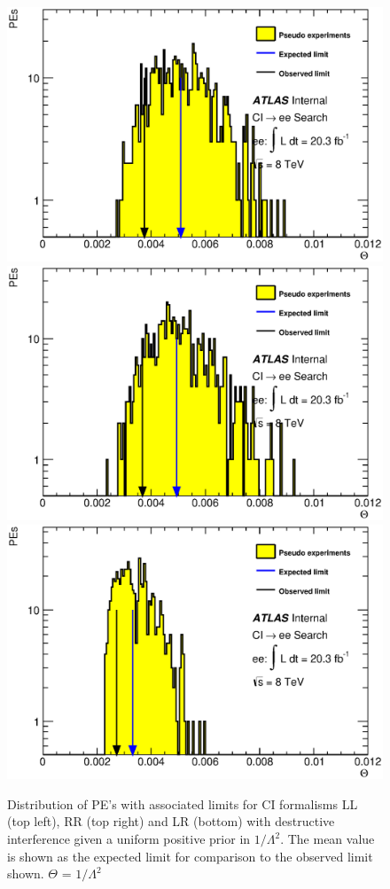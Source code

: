     \begin{figure}[h]
        \begin{center}
            \includegraphics[width=0.7\linewidth]{images/ee__LL_plus_L2/Theta.eps}
            \includegraphics[width=0.7\linewidth]{images/ee__RR_plus_L2/Theta.eps}
            \includegraphics[width=0.7\linewidth]{images/ee__LR_plus_L2/Theta.eps}
        \end{center}
       \caption{Distribution of PE's with associated limits for CI formalisms LL (top left), RR (top right) and LR (bottom) with destructive interference given a uniform positive prior in $1/\Lambda^{2}$. The mean value is shown as the expected limit for comparison to the observed limit shown. $\Theta$ = $1/\Lambda^{2}$}
       \label{fig:Theta_CI_des}
    \end{figure}




